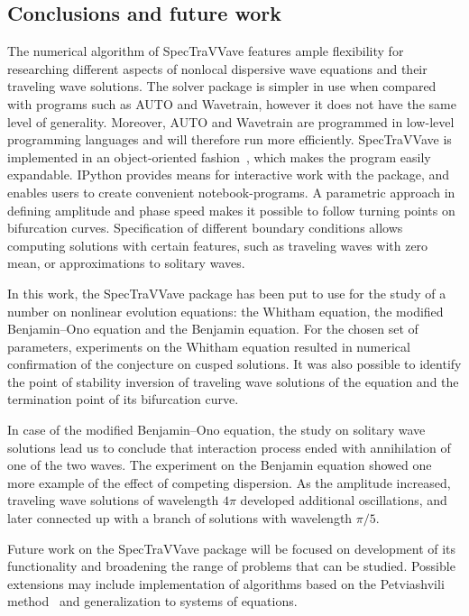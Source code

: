 \subsection{Conclusions and future work}
\label{sec:conclusion}

The numerical algorithm of \textsf{SpecTraVVave} features ample flexibility for researching 
different aspects of nonlocal dispersive wave equations and their traveling wave solutions.
The solver package is simpler in use when compared with programs such as \textsf{AUTO} and 
\textsf{Wavetrain}, however it does not have the same level of generality. 
Moreover, \textsf{AUTO} and \textsf{Wavetrain} are programmed in low-level programming languages
and will therefore run more efficiently.
\textsf{SpecTraVVave} is implemented in an object-oriented fashion~\cite{Verdier2014}, 
which makes the program easily expandable.
\textsf{IPython} provides means for interactive work with the package, 
and enables users to create convenient notebook-programs.
A parametric approach in defining amplitude and phase speed makes it possible to follow
turning points on bifurcation curves. Specification of different boundary conditions allows 
computing solutions with certain features, such as traveling waves with zero mean, 
or approximations to solitary waves. 


In this work, the \textsf{SpecTraVVave} package has been put to use for the study of 
a number on nonlinear evolution equations: the Whitham equation, the modified Benjamin--Ono equation
and the Benjamin equation.
For the chosen set of parameters, experiments on the Whitham equation resulted in numerical 
confirmation of the conjecture on cusped solutions. It was also possible to identify the point of stability 
inversion of traveling wave solutions of the equation and the termination point of its bifurcation curve.

In case of the modified Benjamin--Ono equation, the study on solitary wave solutions lead us to conclude that 
interaction process ended with annihilation of one of the two waves. 
The experiment on the Benjamin equation showed one more example of the effect of competing dispersion.
As the amplitude increased, traveling wave solutions of wavelength $4\pi$ developed
additional oscillations, and later connected up with a branch of solutions with
wavelength $\pi/5$.


Future work on the \textsf{SpecTraVVave} package will be focused on development of its functionality and broadening the range of problems that can be studied. Possible extensions may include implementation of algorithms based on the Petviashvili method~\citep{Alvarez2014, Alvarez2014j} and generalization to systems of equations.

